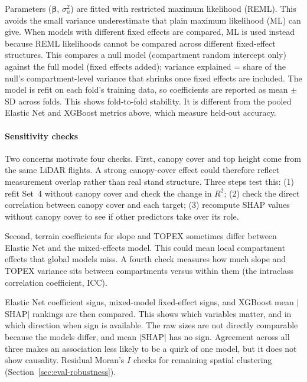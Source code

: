 \documentclass[logo,msc,ai]{infthesis}           %
\begin{document}
Parameters ($\boldsymbol{\beta}$, $\sigma_u^2$) are fitted with restricted maximum likelihood (REML). This avoids the small variance underestimate that plain maximum likelihood (ML) can give. When models with different fixed effects are compared, ML is used instead because REML likelihoods cannot be compared across different fixed-effect structures. This compares a null model (compartment random intercept only) against the full model (fixed effects added); variance explained = share of the null's compartment-level variance that shrinks once fixed effects are included. The model is refit on each fold's training data, so coefficients are reported as mean $\pm$ SD across folds. This shows fold-to-fold stability. It is different from the pooled Elastic Net and XGBoost metrics above, which measure held-out accuracy.

\paragraph*{Sensitivity checks}
Two concerns motivate four checks. First, canopy cover and top height come from the same LiDAR flights. A strong canopy-cover effect could therefore reflect measurement overlap rather than real stand structure. Three steps test this: (1) refit Set~4 without canopy cover and check the change in $R^2$; (2) check the direct correlation between canopy cover and each target; (3) recompute SHAP values without canopy cover to see if other predictors take over its role.

Second, terrain coefficients for slope and TOPEX sometimes differ between Elastic Net and the mixed-effects model. This could mean local compartment effects that global models miss. A fourth check measures how much slope and TOPEX variance sits between compartments versus within them (the intraclass correlation coefficient, ICC).

Elastic Net coefficient signs, mixed-model fixed-effect signs, and XGBoost mean $|$SHAP$|$ rankings are then compared. This shows which variables matter, and in which direction when sign is available. The raw sizes are not directly comparable because the models differ, and mean $|$SHAP$|$ has no sign. Agreement across all three makes an association less likely to be a quirk of one model, but it does not show causality. Residual Moran's $I$ checks for remaining spatial clustering (Section~\ref{sec:eval-robustness}).
\end{document}
